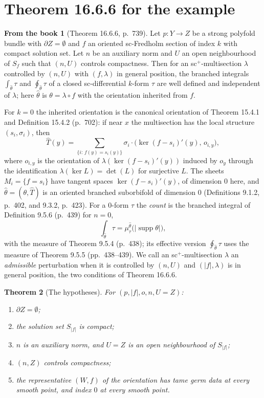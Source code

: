 \documentclass[11pt,a4paper]{article}
\theoremstyle{plain}
\newtheorem{theorem}{Theorem}[section]
\theoremstyle{definition}
\newtheorem{recall}[theorem]{From the book}
\theoremstyle{remark}
\newcommand{\abs}[1]{\lvert #1\rvert}
\newcommand{\supp}{\operatorname{supp}}
\begin{document}
\section{Theorem 16.6.6 for the example}\label{sec:theorem}

\begin{recall}[Theorem 16.6.6, p.~739]
Let $p\colon Y\to Z$ be a strong polyfold bundle with $\partial Z=\emptyset$ and $f$ an oriented
sc-Fredholm section of index $k$ with compact solution set. Let $n$ be an auxiliary norm and $U$ an open
neighbourhood of $S_f$ such that $(n,U)$ controls compactness. Then for an sc$^+$-multisection $\lambda$
controlled by $(n,U)$ with $(f,\lambda)$ in general position, the branched integrals $\int_{\hat\theta}\tau$
and $\oint_{\hat\theta}\tau$ of a closed sc-differential $k$-form $\tau$ are well defined and independent
of $\lambda$; here $\hat\theta$ is $\theta=\lambda\circ f$ with the orientation inherited from $f$.
\end{recall}

For $k=0$ the inherited orientation is the canonical orientation of Theorem 15.4.1 and
Definition 15.4.2 (p.~702): if near $x$ the multisection has the local structure $(s_i,\sigma_i)$, then
\[
  \hat T(y)=\sum_{\{i:\,f(y)=s_i(y)\}}\sigma_i\cdot\bigl(\ker(f-s_i)'(y),\,o_{i,y}\bigr),
\]
where $o_{i,y}$ is the orientation of $\lambda(\ker(f-s_i)'(y))$ induced by $o_y$ through the
identification $\lambda(\ker L)=\det(L)$ for surjective $L$. The sheets $M_i=\{f=s_i\}$ have tangent
spaces $\ker(f-s_i)'(y)$, of dimension $0$ here, and $\hat\theta=(\theta,\hat T)$ is an oriented branched
suborbifold of dimension $0$ (Definitions 9.1.2, p.~402, and 9.3.2, p.~423). For a $0$-form $\tau$ the
\emph{count} is the branched integral of Definition 9.5.6 (p.~439) for $n=0$,
\[
  \int_{\hat\theta}\tau=\mu^{\hat\theta}_\tau\bigl(\abs{\supp\theta}\bigr),
\]
with the measure of Theorem 9.5.4 (p.~438); its effective version $\oint_{\hat\theta}\tau$ uses the
measure of Theorem 9.5.5 (pp.~438--439). We call an sc$^+$-multisection $\lambda$ an \emph{admissible}
perturbation when it is controlled by $(n,U)$ and $(\abs f,\lambda)$ is in general position, the two
conditions of Theorem 16.6.6.

\begin{theorem}[The hypotheses]\label{thm:hyp}
For $(p,\abs f,o,n,U=Z)$:
\begin{enumerate}[label=(\alph*)]
\item $\partial Z=\emptyset$;
\item the solution set $S_{\abs f}$ is compact;
\item $n$ is an auxiliary norm, and $U=Z$ is an open neighbourhood of $S_{\abs f}$;
\item $(n,Z)$ controls compactness;
\item the representative $(W,f)$ of the orientation has tame germ data at every smooth point, and index
  $0$ at every smooth point.
\end{enumerate}
\end{theorem}
\end{document}
